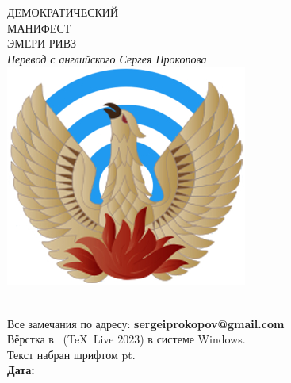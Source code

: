 \makeatletter
{}%
\makeatother

\begin{center}
{%
\titlefont
\titlefontsize
ДЕМОКРАТИЧЕСКИЙ\\
МАНИФЕСТ\\
}%
{%
\subtitlefont
\subtitlefontsize
ЭМЕРИ РИВЗ\\
}%
{%
\itshape\large Перевод с английского Сергея Прокопова\\
}%
\includegraphics[width=0.15\columnwidth]{images/Phoenix-Logo-Circles.jpg}\\
\titlesepbig\\
\end{center}

\titleframe

\newpage

\begin{center}
\parbox{0.9\linewidth}{\centering
Все замечания по адресу: {\makeatletter\upshape\bfseries sergeiprokopov@gmail.com\makeatother}\\[1ex]
Вёрстка в \XeLaTeX\ (\TeX\ Live 2023) в системе Windows.\\
Текст набран шрифтом \textbf{\itshape{}\mainfontname} \mainfontsizehr pt.\\[5pt]
\upshape\bfseries Дата: \mytoday{}\\
}
\end{center}

\titleframe
